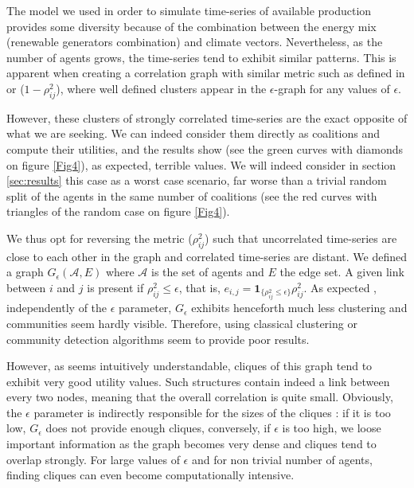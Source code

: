 \documentclass[conference]{IEEEtran}
\begin{document}
The model we used in order to simulate time-series of available production provides some diversity because of the combination between the energy mix (renewable generators combination) and climate vectors. Nevertheless, as the number of agents grows, the time-series tend to exhibit similar patterns. This is apparent when creating a correlation graph with similar metric such as defined in \cite{Garas2008} or \cite{Onnela2004} ($ 1 - \rho_{ij}^{2} $), where well defined clusters appear in the $ \epsilon $-graph for any values of $ \epsilon $. 

However, these clusters of strongly correlated time-series are the exact opposite of what we are seeking. We can indeed consider them directly as coalitions and compute their utilities, and the results show (see the green curves with diamonds on figure \ref{Fig4}), as expected, terrible values. We will indeed consider in section \ref{sec:results} this case as a worst case scenario, far worse than a trivial random split of the agents in the same number of coalitions (see the red curves with triangles of the random case on figure \ref{Fig4}). 

We thus opt for reversing the metric ($ \rho_{ij}^{2} $) such that uncorrelated time-series are close to each other in the graph and correlated time-series are distant. We defined a graph $G_\epsilon(\mathcal{A},E)$ where $\mathcal{A}$ is the set of agents and $ E $ the edge set. A given link between $ i $ and $ j $ is present if $ \rho_{ij}^{2} \leq \epsilon $, that is, $ e_{i,j} = \mathbf{1}_{\{\rho_{ij}^{2} \leq \epsilon \}}\rho_{ij}^{2} $. As expected \cite{Onnela2004}, independently of the $ \epsilon $ parameter, $ G_{\epsilon } $ exhibits henceforth much less clustering and communities seem hardly visible. Therefore, using classical clustering or community detection algorithms seem to provide poor results. 

However, as seems intuitively understandable, cliques of this graph tend to exhibit very good utility values. Such  structures contain indeed a link between every two nodes, meaning that the overall correlation is quite small. Obviously, the $ \epsilon $ parameter is indirectly responsible for the sizes of the cliques : if it is too low, $ G_{\epsilon} $ does not provide enough cliques, conversely, if $\epsilon $ is too high, we loose important information as the graph becomes very dense and cliques tend to overlap strongly. For large values of $ \epsilon $ and for non trivial number of agents, finding cliques can even become computationally intensive. 
\end{document}
